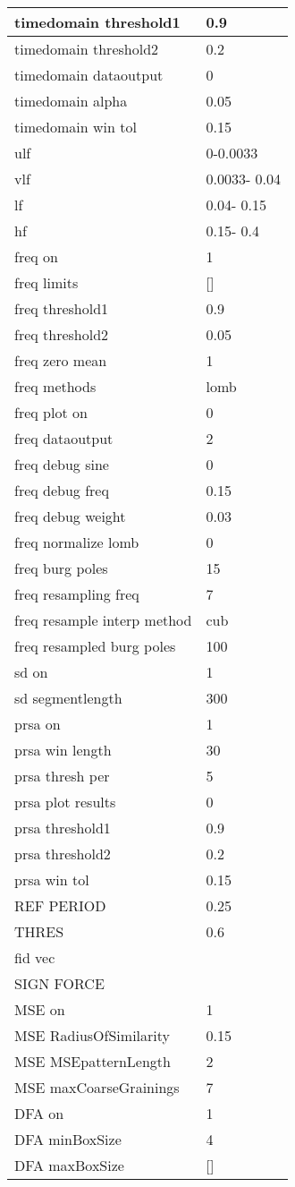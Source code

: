 \begin{tabular}{|l|l|}
timedomain threshold1&0.9\\\hline
timedomain threshold2&0.2\\\hline
timedomain dataoutput&0\\\hline
timedomain alpha&0.05\\\hline
timedomain win tol&0.15\\\hline
ulf&     0-0.0033\\\hline
vlf&0.0033-  0.04\\\hline
lf&  0.04-  0.15\\\hline
hf&  0.15-   0.4\\\hline
freq on&1\\\hline
freq limits&[]\\\hline
freq threshold1&0.9\\\hline
freq threshold2&0.05\\\hline
freq zero mean&1\\\hline
freq methods&lomb\\\hline
freq plot on&0\\\hline
freq dataoutput&2\\\hline
freq debug sine&0\\\hline
freq debug freq&0.15\\\hline
freq debug weight&0.03\\\hline
freq normalize lomb&0\\\hline
freq burg poles&15\\\hline
freq resampling freq&7\\\hline
freq resample interp method&cub\\\hline
freq resampled burg poles&100\\\hline
sd on&1\\\hline
sd segmentlength&300\\\hline
prsa on&1\\\hline
prsa win length&30\\\hline
prsa thresh per&5\\\hline
prsa plot results&0\\\hline
prsa threshold1&0.9\\\hline
prsa threshold2&0.2\\\hline
prsa win tol&0.15\\\hline
REF PERIOD&0.25\\\hline
THRES&0.6\\\hline
fid vec&\\\hline
SIGN FORCE&\\\hline
MSE on&1\\\hline
MSE RadiusOfSimilarity&0.15\\\hline
MSE MSEpatternLength&2\\\hline
MSE maxCoarseGrainings&7\\\hline
DFA on&1\\\hline
DFA minBoxSize&4\\\hline
DFA maxBoxSize&[]\\\hline
\end{tabular}
